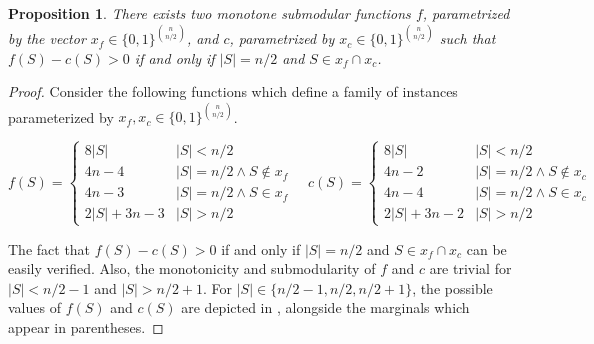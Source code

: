 \documentclass[11pt]{article}
\newtheorem{proposition}{Proposition}
\begin{document}
\begin{proposition}
    There exists two monotone submodular functions $f$, parametrized by the vector $x_f \in \{0,1\}^{\binom{n}{n/2}}$, and $c$, parametrized by $x_c \in \{0,1\}^{\binom{n}{n/2}}$ such that $f(S) - c(S) > 0$ if and only if $|S|=n/2$ and $S \in x_f \cap x_c$.
\end{proposition}
\begin{proof}
Consider the following functions which define a family of instances parameterized by $x_f,x_c \in \{0,1\}^{\binom{n}{n/2}}$.

\begin{equation}\label{eq:sub-sub}
    f(S) = \begin{cases}
    8|S| & |S|<n/2 \\
    4n-4 & |S|=n/2 \land S \notin x_f\\
    4n-3 & |S|=n/2 \land S \in x_f \\
    2|S| + 3n - 3 & |S|>n/2
\end{cases}
\quad
c(S) = \begin{cases}
    8|S| & |S|<n/2 \\
    4n-2 & |S|=n/2 \land S \notin x_c\\
    4n-4 & |S|=n/2 \land S \in x_c \\
    2|S|+3n-2 & |S|>n/2
\end{cases}
\end{equation}

The fact that $f(S) - c(S) > 0$ if and only if $|S|=n/2$ and $S \in x_f \cap x_c$ can be easily verified. Also, the monotonicity and submodularity of $f$ and $c$ are trivial for $|S| < n/2-1$ and $|S|>n/2+1$. For $|S|\in \{n/2-1,n/2,n/2+1\}$, the possible values of $f(S)$ and $c(S)$ are depicted in , alongside the marginals which appear in parentheses.
\end{proof}
\end{document}
